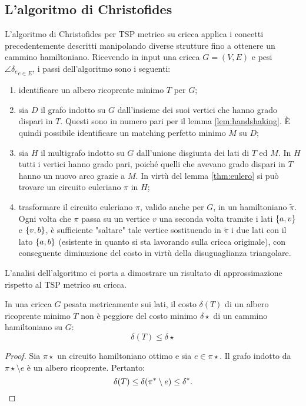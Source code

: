 \subsection{L'algoritmo di Christofides}
L'algoritmo di Christofides per TSP metrico su cricca applica i concetti precedentemente descritti manipolando diverse strutture fino a ottenere un cammino hamiltoniano. Ricevendo in input una cricca $G=(V,E)$ e pesi $\angle{\delta_e}_{e\in E}$, i passi dell'algoritmo sono i seguenti:
\begin{enumerate}
	\item identificare un albero ricoprente minimo $T$ per $G$;
	\item sia $D$ il grafo indotto su $G$ dall'insieme dei suoi vertici che hanno grado dispari in $T$.
	      Questi sono in numero pari per il lemma \ref{lem:handshaking}. È quindi possibile identificare un matching perfetto minimo $M$ su $D$;
	\item sia $H$ il multigrafo indotto su $G$ dall'unione disgiunta dei lati di $T$ ed $M$. In $H$ tutti i vertici hanno grado pari, poiché quelli che avevano grado dispari in $T$ hanno un nuovo arco grazie a $M$. In virtù del lemma \ref{thm:eulero} si può trovare un circuito euleriano $\pi$ in $H$;
	\item trasformare il circuito euleriano $\pi$, valido anche per $G$, in un hamiltoniano $\tilde\pi$.
	      Ogni volta che $\pi$ passa su un vertice $v$ una seconda volta tramite i lati $\set{a,v}$ e $\set{v,b}$, è sufficiente "saltare" tale vertice sostituendo in $\tilde\pi$ i due lati con il lato $\set{a,b}$ (esistente in quanto si sta lavorando sulla cricca originale), con conseguente diminuzione del costo in virtù della disuguaglianza triangolare.
\end{enumerate}

L'analisi dell'algoritmo ci porta a dimostrare un risultato di approssimazione rispetto al TSP metrico su cricca.
\begin{lemma}\label{lem:chri_spanning}
	In una cricca $G$ pesata metricamente sui lati, il costo $\delta(T)$ di un albero ricoprente minimo $T$ non è peggiore del costo minimo $\delta\star$ di un cammino hamiltoniano su $G$:
	\begin{equation*}
		\delta(T) \leq \delta\star
	\end{equation*}
\end{lemma}
\begin{proof}
	Sia $\pi\star$ un circuito hamiltoniano ottimo e sia $e\in\pi\star$.
	Il grafo indotto da $\pi\star\setminus e$ è un albero ricoprente. Pertanto:
	\begin{equation*}
		\delta(T) \leq \delta(\pi\star\setminus e) \leq\delta\star \text.
	\end{equation*}
\end{proof}

